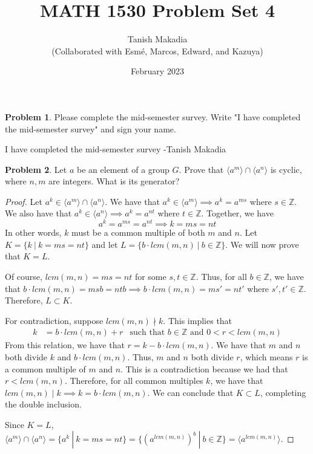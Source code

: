 \documentclass[12pt,reqno]{article}
\title{MATH 1530 Problem Set 4}
\author{Tanish Makadia\\\small{(Collaborated with Esmé, Marcos, Edward, and Kazuya)}}
\date{February 2023}
\newcommand{\Z}{\mathbb{Z}}
\theoremstyle{plain}
\theoremstyle{definition}
\newtheorem{problem}{Problem}
\begin{document}
\maketitle


\begin{problem}
    Please complete the mid-semester survey. Write "I have completed the mid-semester survey" and sign your name.
\end{problem}

I have completed the mid-semester survey -Tanish Makadia

\newpage


\begin{problem}
    Let \(a\) be an element of a group \(G\). Prove that \(\langle a^m\rangle \cap \langle a^n\rangle\)
    is cyclic, where \(n,m\) are integers. What is its generator?
\end{problem}

\begin{proof}
    Let \(a^k\in \langle a^m\rangle \cap \langle a^n\rangle\). We have that \(a^{k}\in\langle a^m\rangle\implies a^k=a^{ms}\) where \(s\in\Z\). 
    We also have that \(a^k\in\langle a^n\rangle\implies a^k=a^{nt}\) where \(t\in\Z\). Together, we have
    \[a^k=a^{ms}=a^{nt}\implies k=ms=nt\]
    In other words, \(k\) must be a common multiple of both \(m\) and \(n\). Let \(K = \{k\ |\ k=ms=nt\}\) and let \(L = \{b\cdot lcm(m,n)\ |\ b\in\Z\}\). We will now prove that \(K=L\).

    Of course, \(lcm(m,n)=ms=nt\) for some \(s,t\in\Z\). Thus, for all \(b\in\Z\), we have that \(b\cdot lcm(m,n)=msb=ntb\implies b\cdot lcm(m,n)=ms'=nt'\) where \(s',t'\in\Z\).
    Therefore, \(L\subset K\).

    For contradiction, suppose \(lcm(m,n)\nmid k\). This implies that
    \begin{align*}
        k&=b\cdot lcm(m,n) + r &\text{such that \(b\in\Z\) and \(0<r<lcm(m,n)\)}
    \end{align*}
    From this relation, we have that \(r = k - b\cdot lcm(m,n)\). We have that \(m\) and \(n\) both divide \(k\) and \(b\cdot lcm(m,n)\).
    Thus, \(m\) and \(n\) both divide \(r\), which means \(r\) is a common multiple of \(m\) and \(n\). This is a contradiction
    because we had that \(r<lcm(m,n)\). Therefore, for all common multiples \(k\), we have that \(lcm(m,n)\mid k\implies k=b\cdot lcm(m,n)\).
    We can conclude that \(K\subset L\), completing the double inclusion.
    
    Since \(K=L\), \(\langle a^m\rangle \cap \langle a^n\rangle=\{a^k\ |\ k=ms=nt\}=\{(a^{lcm(m,n)})^b\ |\ b\in\Z\}=\langle a^{lcm(m,n)}\rangle\). 
\end{proof}
\end{document}
